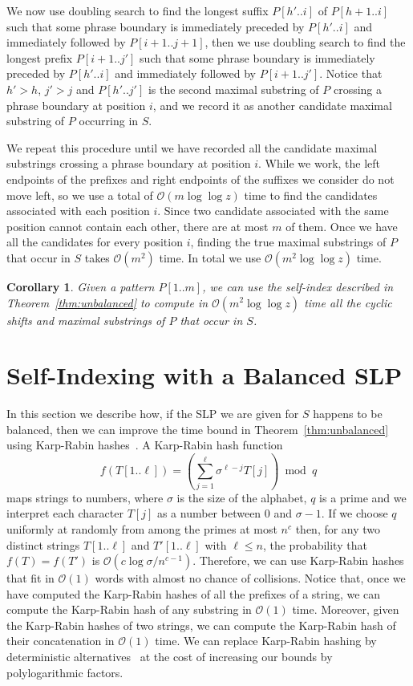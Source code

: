 \documentclass[review]{elsarticle}
\newtheorem{corollary}[theorem]{Corollary}
\newcommand{\Oh}[1]
    {\ensuremath{\mathcal{O}\!\left( {#1} \right)}}
\begin{document}
We now use doubling search to find the longest suffix \(P [h'..i]\) of \(P [h + 1..i]\) such that some phrase boundary is immediately preceded by \(P [h'..i]\) and immediately followed by \(P [i + 1..j + 1]\), then we use doubling search to find the longest prefix \(P [i + 1..j']\) such that some phrase boundary is immediately preceded by \(P [h'..i]\) and immediately followed by \(P [i + 1..j']\).  Notice that \(h' > h\), \(j' > j\) and \(P [h'..j']\) is the second maximal substring of $P$ crossing a phrase boundary at position $i$, and we record it as another candidate maximal substring of $P$ occurring in $S$.

We repeat this procedure until we have recorded all the candidate maximal substrings crossing a phrase boundary at position $i$.  While we work, the left endpoints of the prefixes and right endpoints of the suffixes we consider do not move left, so we use a total of $\Oh{m \log \log z}$ time to find the candidates associated with each position $i$.  Since two candidate associated with the same position cannot contain each other, there are at most $m$ of them.  Once we have all the candidates for every position $i$, finding the true maximal substrings of $P$ that occur in $S$ takes $\Oh{m^2}$ time.  In total we use $\Oh{m^2 \log \log z}$ time.

\begin{corollary} \label{cor:circular}
Given a pattern \(P [1..m]\), we can use the self-index described in Theorem~\ref{thm:unbalanced} to compute in $\Oh{m^2 \log \log z}$ time all the cyclic shifts and maximal substrings of $P$ that occur in $S$.
\end{corollary}

\section{Self-Indexing with a Balanced SLP} \label{sec:balanced}

In this section we describe how, if the SLP we are given for $S$ happens to be balanced, then we can improve the time bound in Theorem~\ref{thm:unbalanced} using Karp-Rabin hashes~\cite{KR87}.  A Karp-Rabin hash function
\[f (T [1..\ell]) = \left( \sum_{j = 1}^\ell \sigma^{\ell - j} T [j] \right) \bmod q\]
maps strings to numbers, where $\sigma$ is the size of the alphabet, $q$ is a prime and we interpret each character \(T [j]\) as a number between 0 and \(\sigma - 1\).  If we choose $q$ uniformly at randomly from among the primes at most $n^c$ then, for any two distinct strings \(T [1..\ell]\) and \(T' [1..\ell]\) with \(\ell \leq n\), the probability that \(f (T) = f (T')\) is $\Oh{c \log \sigma / n^{c - 1}}$.  Therefore, we can use Karp-Rabin hashes that fit in $\Oh{1}$ words with almost no chance of collisions.  Notice that, once we have computed the Karp-Rabin hashes of all the prefixes of a string, we can compute the Karp-Rabin hash of any substring in $\Oh{1}$ time.  Moreover, given the Karp-Rabin hashes of two strings, we can compute the Karp-Rabin hash of their concatenation in $\Oh{1}$ time.  We can replace Karp-Rabin hashing by deterministic alternatives~\cite{MSU97,ABR00} at the cost of increasing our bounds by polylogarithmic factors.
\end{document}

